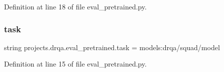 Definition at line 18 of file eval\+\_\+pretrained.\+py.

\mbox{\label{namespaceprojects_1_1drqa_1_1eval__pretrained_a1a4525d006d3214f0f4456bdbe36770c}} 
\subsubsection{\texorpdfstring{task}{task}}
{\footnotesize\ttfamily string projects.\+drqa.\+eval\+\_\+pretrained.\+task = \textquotesingle{}models\+:drqa/squad/model\textquotesingle{}}



Definition at line 15 of file eval\+\_\+pretrained.\+py.

